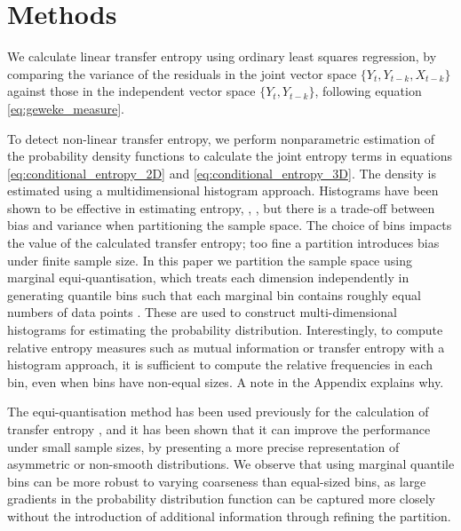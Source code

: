 \documentclass[]{rsos}%
\begin{document}
\section{Methods} \label{s.method}

  We calculate linear transfer entropy using ordinary least squares regression, by comparing the variance of the residuals in the joint vector space $ \{Y_t, Y_{t-k}, X_{t-k} \} $ against those in the independent vector space $ \{Y_t, Y_{t-k}\}$, following equation \ref{eq:geweke_measure}. 
  
  To detect non-linear transfer entropy, we perform nonparametric estimation of the probability density functions to calculate the joint entropy terms in equations \ref{eq:conditional_entropy_2D} and \ref{eq:conditional_entropy_3D}. The density is estimated using a multidimensional histogram approach. Histograms have been shown to be effective in estimating entropy, \cite{boba2015efficient}, \cite{Marschinski2002}, but there is a trade-off between bias and variance when partitioning the sample space. The choice of bins impacts the value of the calculated transfer entropy; too fine a partition introduces bias under finite sample size. In this paper we partition the sample space using marginal equi-quantisation, which treats each dimension independently in generating quantile bins such that each marginal bin contains roughly equal numbers of data points \cite{hlavavckova2007causality}. These are used to construct multi-dimensional histograms for estimating the probability distribution. 
Interestingly, to compute relative entropy measures such as mutual information or transfer entropy with a histogram approach, it is sufficient to compute the relative frequencies in each bin, even when bins have non-equal sizes. A note in the Appendix explains why.
  
  The equi-quantisation method has been used previously for the calculation of transfer entropy \cite{hlavavckova2007causality} \cite{darbellay1999estimation}, \cite{Marschinski2002} and it has been shown that it can improve the performance under small sample sizes, by presenting a more precise representation of asymmetric or non-smooth distributions. We observe that using marginal quantile bins can be more robust to varying coarseness than equal-sized bins, as large gradients in the probability distribution function can be captured more closely without the introduction of additional information through refining the partition. 
   
\end{document}
